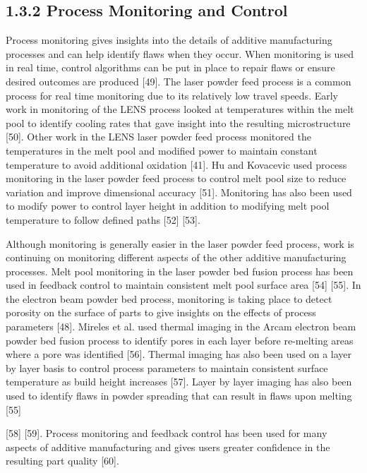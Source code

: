 \documentclass[10pt]{article}
\begin{document}
\subsection*{1.3.2 Process Monitoring and Control}
Process monitoring gives insights into the details of additive manufacturing processes and can help identify flaws when they occur. When monitoring is used in real time, control algorithms can be put in place to repair flaws or ensure desired outcomes are produced [49]. The laser powder feed process is a common process for real time monitoring due to its relatively low travel speeds. Early work in monitoring of the LENS process looked at temperatures within the melt pool to identify cooling rates that gave insight into the resulting microstructure [50]. Other work in the LENS laser powder feed process monitored the temperatures in the melt pool and modified power to maintain constant temperature to avoid additional oxidation [41]. Hu and Kovacevic used process monitoring in the laser powder feed process to control melt pool size to reduce variation and improve dimensional accuracy [51]. Monitoring has also been used to modify power to control layer height in addition to modifying melt pool temperature to follow defined paths [52] [53].

Although monitoring is generally easier in the laser powder feed process, work is continuing on monitoring different aspects of the other additive manufacturing processes. Melt pool monitoring in the laser powder bed fusion process has been used in feedback control to maintain consistent melt pool surface area [54] [55]. In the electron beam powder bed process, monitoring is taking place to detect porosity on the surface of parts to give insights on the effects of process parameters [48]. Mireles et al. used thermal imaging in the Arcam electron beam powder bed fusion process to identify pores in each layer before re-melting areas where a pore was identified [56]. Thermal imaging has also been used on a layer by layer basis to control process parameters to maintain consistent surface temperature as build height increases [57]. Layer by layer imaging has also been used to identify flaws in powder spreading that can result in flaws upon melting [55]

[58] [59]. Process monitoring and feedback control has been used for many aspects of additive manufacturing and gives users greater confidence in the resulting part quality [60].
\end{document}
